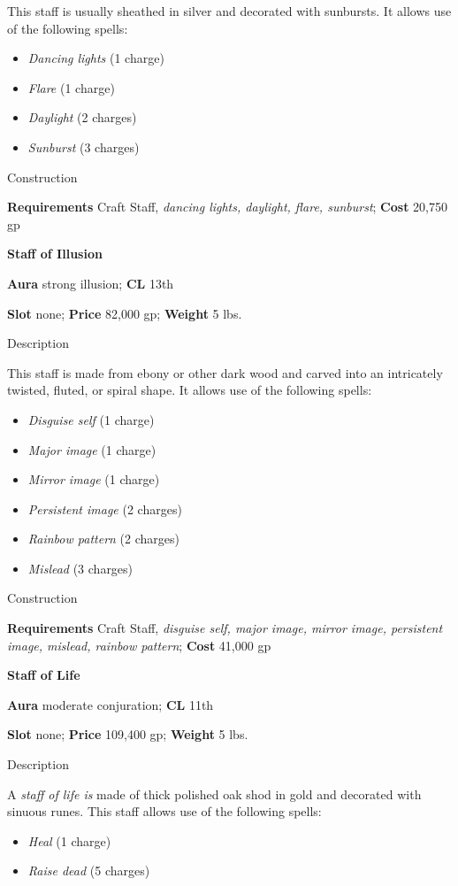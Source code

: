 This staff is usually sheathed in silver and decorated with sunbursts. It allows use of the following spells:
				\begin{itemize}\item  \textit{Dancing lights} (1 charge)
				\item  \textit{Flare} (1 charge)
				\item  \textit{Daylight} (2 charges)
				\item  \textit{Sunburst} (3 charges) 
\end{itemize}
				
Construction
				
\textbf{Requirements} Craft Staff, \textit{dancing lights, daylight, flare, sunburst}; \textbf{Cost }20,750 gp
				
\textbf{Staff of Illusion}
				
\textbf{Aura} strong illusion; \textbf{CL} 13th
				
\textbf{Slot} none; \textbf{Price} 82,000 gp; \textbf{Weight} 5 lbs.
				
Description
				
This staff is made from ebony or other dark wood and carved into an intricately twisted, fluted, or spiral shape. It allows use of the following spells:
				\begin{itemize}\item  \textit{Disguise self} (1 charge)
				\item  \textit{Major image} (1 charge)
				\item  \textit{Mirror image} (1 charge)
				\item  \textit{Persistent image} (2 charges)
				\item  \textit{Rainbow pattern} (2 charges)
				\item  \textit{Mislead} (3 charges) 
\end{itemize}
				
Construction
				
\textbf{Requirements} Craft Staff, \textit{disguise self, major image, mirror image, persistent image, mislead, rainbow pattern}; \textbf{Cost }41,000 gp
				
\textbf{Staff of Life}
				
\textbf{Aura} moderate conjuration;\textbf{ CL }11th
				
\textbf{Slot} none; \textbf{Price} 109,400 gp; \textbf{Weight} 5 lbs.
				
Description
				
A \textit{staff of life is} made of thick polished oak shod in gold and decorated with sinuous runes. This staff allows use of the following spells:
				\begin{itemize}\item  \textit{Heal} (1 charge)
				\item  \textit{Raise dead} (5 charges) 
\end{itemize}
				

